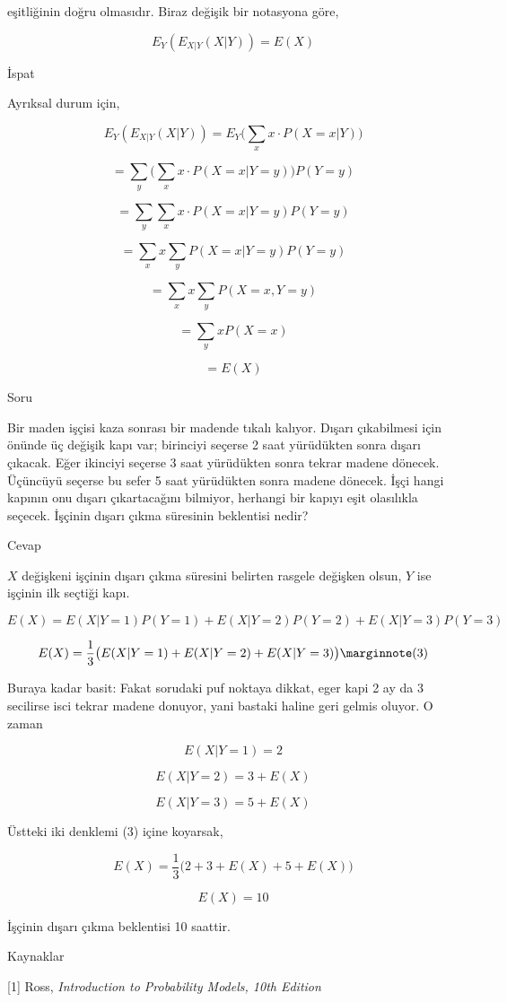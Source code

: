 \documentclass[12pt,fleqn]{article}\usepackage{../../common}
\begin{document}
eşitliğinin doğru olmasıdır. Biraz değişik bir notasyona göre,

$$ E_Y (E_{X|Y} (X|Y)) = E(X) $$

İspat

Ayrıksal durum için,

$$ E_Y (E_{X|Y} (X|Y)) = E_Y \bigg( \sum_{x} x \cdot P(X=x|Y) \bigg) $$

$$  = \sum_y \bigg( \sum _x x \cdot P(X=x|Y=y) \bigg) P(Y=y) $$

$$  = \sum_y  \sum _x x \cdot P(X=x|Y=y) P(Y=y) $$

$$  = \sum_x x \sum _y P(X=x|Y=y) P(Y=y) $$

$$  = \sum_x x \sum _y P(X=x,Y=y) $$

$$  = \sum_y x  P(X=x) $$

$$ = E(X) $$

Soru

Bir maden işçisi kaza sonrası bir madende tıkalı kalıyor. Dışarı çıkabilmesi
için önünde üç değişik kapı var; birinciyi seçerse 2 saat yürüdükten sonra
dışarı çıkacak. Eğer ikinciyi seçerse 3 saat yürüdükten sonra tekrar madene
dönecek. Üçüncüyü seçerse bu sefer 5 saat yürüdükten sonra madene dönecek. İşçi
hangi kapının onu dışarı çıkartacağını bilmiyor, herhangi bir kapıyı eşit
olasılıkla seçecek. İşçinin dışarı çıkma süresinin beklentisi nedir?

Cevap

$X$ değişkeni işçinin dışarı çıkma süresini belirten rasgele değişken olsun,
$Y$ ise işçinin ilk seçtiği kapı.

$$
E(X) = E(X | Y=1) P(Y=1) + E(X | Y=2) P(Y=2) +E(X | Y=3) P(Y=3) 
$$

$$
E(X) = \frac{1}{3} \big( E(X | Y=1)  + E(X | Y=2) +E(X | Y=3) \big)
\mlabel{3}
$$

Buraya kadar basit: Fakat sorudaki puf noktaya dikkat, eger kapi 2 ay da 3
secilirse isci tekrar madene donuyor, yani bastaki haline geri gelmis oluyor. O
zaman

$$ E(X|Y=1) = 2$$

$$ E(X|Y=2) = 3 + E(X) $$

$$ E(X|Y=3) = 5 + E(X) $$

Üstteki iki denklemi (3) içine koyarsak,

$$
E(X) = \frac{1}{3} \big( 2  + 3 + E(X) + 5 + E(X) \big)
$$

$$ E(X) = 10 $$

İşçinin dışarı çıkma beklentisi 10 saattir.

Kaynaklar

[1] Ross, {\em Introduction to Probability Models, 10th Edition}
\end{document}
